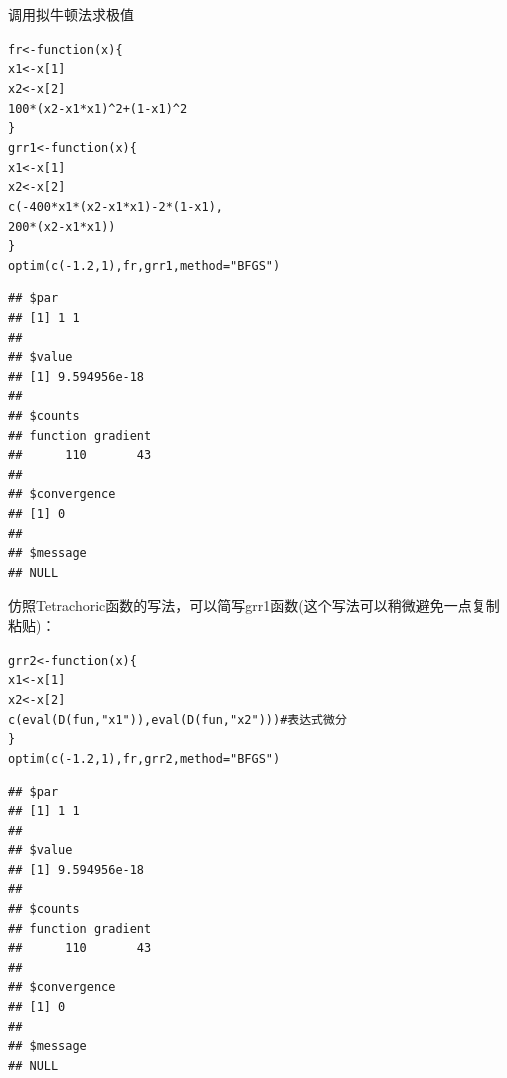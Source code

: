 \documentclass[a4paper]{ctexart}\usepackage[]{graphicx}\usepackage[]{color}
\makeatletter
\newcommand{\hlnum}[1]{\textcolor[rgb]{0.502,0.086,1}{#1}}%
\newcommand{\hlstr}[1]{\textcolor[rgb]{1,0.4,0.2}{#1}}%
\newcommand{\hlcom}[1]{\textcolor[rgb]{1,0.251,0.502}{#1}}%
\newcommand{\hlopt}[1]{\textcolor[rgb]{0.251,0.251,0.251}{#1}}%
\newcommand{\hlstd}[1]{\textcolor[rgb]{0.251,0.251,0.251}{#1}}%
\newcommand{\hlkwa}[1]{\textcolor[rgb]{0.941,0.188,0.816}{#1}}%
\newcommand{\hlkwb}[1]{\textcolor[rgb]{0,0.439,0.902}{#1}}%
\newcommand{\hlkwc}[1]{\textcolor[rgb]{0.188,0.941,0.314}{#1}}%
\newcommand{\hlkwd}[1]{\textcolor[rgb]{0.69,0.188,0.941}{#1}}%
\newenvironment{kframe}{%
 \def\at@end@of@kframe{}%
 \ifinner\ifhmode%
  \def\at@end@of@kframe{\end{minipage}}%
  \begin{minipage}{\columnwidth}%
 \fi\fi%
 \def\FrameCommand##1{\hskip\@totalleftmargin \hskip-\fboxsep
 \colorbox{shadecolor}{##1}\hskip-\fboxsep
     \hskip-\linewidth \hskip-\@totalleftmargin \hskip\columnwidth}%
 \MakeFramed {\advance\hsize-\width
   \@totalleftmargin\z@ \linewidth\hsize
   \@setminipage}}%
 {\par\unskip\endMakeFramed%
 \at@end@of@kframe}
\newenvironment{knitrout}{}{} %
\makeatother
\begin{document}
调用拟牛顿法求极值

\begin{knitrout}
\color{fgcolor}\begin{kframe}
\begin{alltt}
\hlstd{fr} \hlkwb{<-} \hlkwa{function}\hlstd{(}\hlkwc{x}\hlstd{) \{}
    \hlstd{x1} \hlkwb{<-} \hlstd{x[}\hlnum{1}\hlstd{]}
    \hlstd{x2} \hlkwb{<-} \hlstd{x[}\hlnum{2}\hlstd{]}
    \hlnum{100} \hlopt{*} \hlstd{(x2} \hlopt{-} \hlstd{x1} \hlopt{*} \hlstd{x1)}\hlopt{^}\hlnum{2} \hlopt{+} \hlstd{(}\hlnum{1} \hlopt{-} \hlstd{x1)}\hlopt{^}\hlnum{2}
\hlstd{\}}
\hlstd{grr1} \hlkwb{<-} \hlkwa{function}\hlstd{(}\hlkwc{x}\hlstd{) \{}
    \hlstd{x1} \hlkwb{<-} \hlstd{x[}\hlnum{1}\hlstd{]}
    \hlstd{x2} \hlkwb{<-} \hlstd{x[}\hlnum{2}\hlstd{]}
    \hlkwd{c}\hlstd{(}\hlopt{-}\hlnum{400} \hlopt{*} \hlstd{x1} \hlopt{*} \hlstd{(x2} \hlopt{-} \hlstd{x1} \hlopt{*} \hlstd{x1)} \hlopt{-} \hlnum{2} \hlopt{*} \hlstd{(}\hlnum{1} \hlopt{-} \hlstd{x1),}
       \hlnum{200} \hlopt{*}      \hlstd{(x2} \hlopt{-} \hlstd{x1} \hlopt{*} \hlstd{x1))}
\hlstd{\}}
\hlkwd{optim}\hlstd{(}\hlkwd{c}\hlstd{(}\hlopt{-}\hlnum{1.2}\hlstd{,}\hlnum{1}\hlstd{), fr, grr1,} \hlkwc{method} \hlstd{=} \hlstr{"BFGS"}\hlstd{)}
\end{alltt}
\begin{verbatim}
## $par
## [1] 1 1
## 
## $value
## [1] 9.594956e-18
## 
## $counts
## function gradient 
##      110       43 
## 
## $convergence
## [1] 0
## 
## $message
## NULL
\end{verbatim}
\end{kframe}
\end{knitrout}

仿照Tetrachoric函数的写法，可以简写grr1函数(这个写法可以稍微避免一点复制粘贴)：

\begin{knitrout}
\color{fgcolor}\begin{kframe}
\begin{alltt}
\hlstd{grr2}\hlkwb{<-}\hlkwa{function}\hlstd{(}\hlkwc{x}\hlstd{)\{}
  \hlstd{x1} \hlkwb{<-} \hlstd{x[}\hlnum{1}\hlstd{]}
  \hlstd{x2} \hlkwb{<-} \hlstd{x[}\hlnum{2}\hlstd{]}
  \hlkwd{c}\hlstd{(}\hlkwd{eval}\hlstd{(}\hlkwd{D}\hlstd{(fun,}\hlstr{"x1"}\hlstd{)),}\hlkwd{eval}\hlstd{(}\hlkwd{D}\hlstd{(fun,}\hlstr{"x2"}\hlstd{)))}  \hlcom{# 表达式微分}
\hlstd{\}}
\hlkwd{optim}\hlstd{(}\hlkwd{c}\hlstd{(}\hlopt{-}\hlnum{1.2}\hlstd{,}\hlnum{1}\hlstd{), fr, grr2,} \hlkwc{method} \hlstd{=} \hlstr{"BFGS"}\hlstd{)}
\end{alltt}
\begin{verbatim}
## $par
## [1] 1 1
## 
## $value
## [1] 9.594956e-18
## 
## $counts
## function gradient 
##      110       43 
## 
## $convergence
## [1] 0
## 
## $message
## NULL
\end{verbatim}
\end{kframe}
\end{knitrout}
\end{document}
